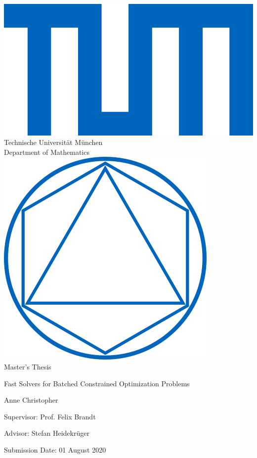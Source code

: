 \documentclass[12pt,a4paper,twoside]{report}
\begin{document}
\pagestyle{empty}
\begin{titlepage}
\begin{center}
\includegraphics[scale=0.15]{TUMlschwarz.png}\\[5mm]
\sf
{\LARGE
  Technische Universit\"at M\"unchen\\[5mm]
  Department of Mathematics\\[8mm]
}
\normalsize
\includegraphics[scale=0.15]{TUMlMschwarz.png}\\[10mm]

{\Large Master's Thesis\\[10mm]}

{\Huge
  Fast Solvers for Batched Constrained Optimization Problems \\[5mm]\par
}
\bigskip

\normalsize

{\Large Anne Christopher}
\end{center}
\vspace*{50mm}

{\Large
\centering
Supervisor: Prof. Felix Brandt
\medskip

Advisor: Stefan Heidekr\"uger
\medskip

Submission Date: 01 August 2020 \par
}
\end{titlepage}
\end{document}
